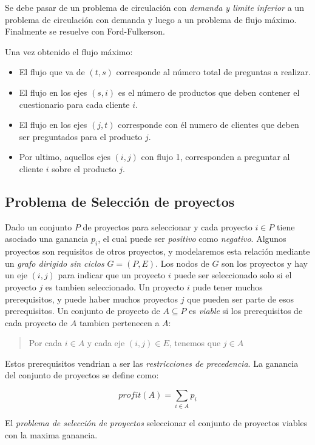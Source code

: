 \documentclass{article}
\begin{document}
Se debe pasar de un problema de circulación con \textit{demanda y limite inferior} a un problema
de circulación con demanda y luego a un problema de flujo máximo. Finalmente se resuelve con Ford-Fulkerson.

Una vez obtenido el flujo máximo:

\begin{itemize}
    \item El flujo que va de \((t,s)\) corresponde al número total de preguntas a realizar.
    \item El flujo en los ejes \((s,i)\) es el número de productos que deben contener el cuestionario para cada cliente \(i\).
    \item El flujo en los ejes \((j,t)\) corresponde con él numero de clientes que deben ser preguntados para el producto \(j\).
    \item Por ultimo, aquellos ejes \((i,j)\) con flujo 1, corresponden a preguntar al cliente \(i\) sobre el producto \(j\).
\end{itemize}

\newpage
\subsection{Problema de Selección de proyectos}

Dado un conjunto \(P\) de proyectos para seleccionar y cada proyecto \(i \in P\) tiene
asociado una ganancia \(p_i\), el cual puede ser \textit{positivo} como \textit{negativo}.
Algunos proyectos son requisitos de otros proyectos, y modelaremos esta relación mediante un \textit{grafo
dirigido sin ciclos} \(G=(P,E)\). Los nodos de \(G\) son los proyectos y hay un eje \((i,j)\) para indicar
que un proyecto \(i\) puede ser seleccionado solo si el proyecto \(j\) es tambien seleccionado.
Un proyecto \(i\) pude tener muchos prerequisitos, y puede haber muchos proyectos \(j\) que pueden
ser parte de esos prerequisitos. Un conjunto de proyecto de \(A \subseteq P\) es \textit{viable} si los 
prerequisitos de cada proyecto de \(A\) tambien pertenecen a \(A\):
\begin{quote}
    Por cada \(i \in A\) y cada eje \((i,j) \in E\), tenemos que \(j \in A\)
\end{quote}
Estos prerequisitos vendrian a ser las \textit{restricciones de precedencia}. La ganancia del conjunto de proyectos
se define como:

\[
    profit(A) = \sum_{i\in A} p_i 
\]

El \textit{problema de selección de proyectos} seleccionar el conjunto de proyectos viables con la maxima ganancia.
\end{document}
